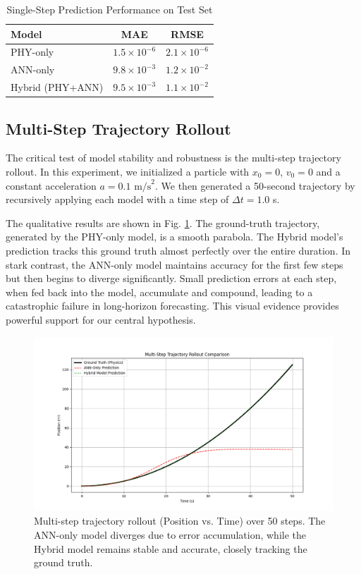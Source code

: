 \documentclass[conference]{IEEEtran}
\begin{document}
\begin{table}[htbp]
\caption{Single-Step Prediction Performance on Test Set}
\begin{center}
\begin{tabular}{|l|c|c|}
\hline
\textbf{Model} & \textbf{MAE} & \textbf{RMSE} \\
\hline
PHY-only & $1.5 \times 10^{-6}$ & $2.1 \times 10^{-6}$ \\
ANN-only & $9.8 \times 10^{-3}$ & $1.2 \times 10^{-2}$ \\
Hybrid (PHY+ANN) & $9.5 \times 10^{-3}$ & $1.1 \times 10^{-2}$ \\
\hline
\end{tabular}
\label{tab:single_step}
\end{center}
\end{table}

\subsection{Multi-Step Trajectory Rollout}
The critical test of model stability and robustness is the multi-step trajectory rollout. In this experiment, we initialized a particle with $x_0=0$, $v_0=0$ and a constant acceleration $a=0.1 \text{ m/s}^2$. We then generated a 50-second trajectory by recursively applying each model with a time step of $\Delta t=1.0$ s.

The qualitative results are shown in Fig. \ref{fig:rollout}. The ground-truth trajectory, generated by the PHY-only model, is a smooth parabola. The Hybrid model's prediction tracks this ground truth almost perfectly over the entire duration. In stark contrast, the ANN-only model maintains accuracy for the first few steps but then begins to diverge significantly. Small prediction errors at each step, when fed back into the model, accumulate and compound, leading to a catastrophic failure in long-horizon forecasting. This visual evidence provides powerful support for our central hypothesis.

\begin{figure}[htbp]
\centerline{\includegraphics[width=\columnwidth]{figure3.png}}
\caption{Multi-step trajectory rollout (Position vs. Time) over 50 steps. The ANN-only model diverges due to error accumulation, while the Hybrid model remains stable and accurate, closely tracking the ground truth.}
\label{fig:rollout}
\end{figure}
\end{document}
